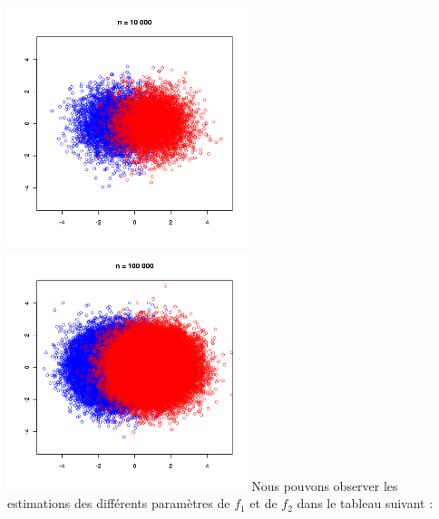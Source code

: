 \documentclass[a4paper, 10pt]{article}
\begin{document}
\includegraphics[height = 7cm, width = 7cm]{plots/plot_simul_9.png}\\
\includegraphics[height = 7cm, width = 7cm]{plots/plot_simul_10.png}
\newpage
\noindent
Nous pouvons observer les estimations des différents paramètres de \textit{$f_{1}$} et de \textit{$f_{2}$} dans le tableau suivant :\\ \\
\end{document}

